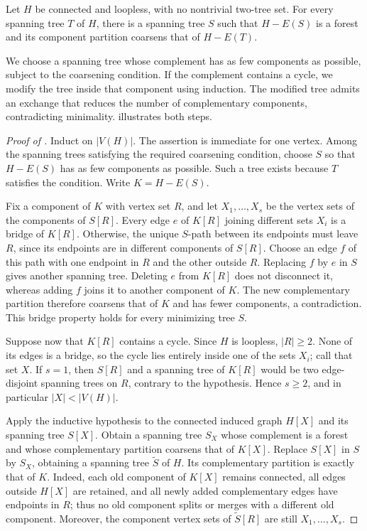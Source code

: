 \documentclass[USenglish, a4paper, thm-restate,numberwithinsect, cleveref]{lipics-v2021}
\begin{document}
\begin{lemma}\label{lem:characterization-exchange}
Let $H$ be connected and loopless, with no nontrivial two-tree set.
For every spanning tree $T$ of $H$, there is a spanning tree $S$ such
that $H-E(S)$ is a forest and its component partition coarsens that
of $H-E(T)$.
\end{lemma}

We choose a spanning tree whose complement has as few components as
possible, subject to the coarsening condition. If the complement
contains a cycle, we modify the tree inside that component using
induction. The modified tree admits an exchange that reduces the
number of complementary components, contradicting minimality.
 illustrates both steps.

\begin{proof}[Proof of ]
Induct on $|V(H)|$. The assertion is immediate for one vertex.
Among the spanning trees satisfying the required coarsening condition,
choose $S$ so that $H-E(S)$ has as few components as possible. Such a
tree exists because $T$ satisfies the condition. Write $K=H-E(S)$.

Fix a component of $K$ with vertex set $R$, and let $X_1,\ldots,X_s$
be the vertex sets of the components of $S[R]$.
Every edge $e$ of $K[R]$ joining different sets $X_i$ is a bridge
of $K[R]$. Otherwise, the unique $S$-path between its endpoints must
leave $R$, since its endpoints are in different components of $S[R]$.
Choose an edge $f$ of this path with one endpoint in $R$ and the other
outside $R$. Replacing $f$ by $e$ in $S$ gives another spanning tree.
Deleting $e$ from $K[R]$ does not disconnect it, whereas adding $f$
joins it to another component of $K$. The new complementary partition
therefore coarsens that of $K$ and has fewer components, a contradiction.
This bridge property holds for every minimizing tree $S$.

Suppose now that $K[R]$ contains a cycle. Since $H$ is loopless,
$|R|\geq2$. None of its edges is a
bridge, so the cycle lies entirely inside one of the sets $X_i$;
call that set $X$. If $s=1$, then $S[R]$ and a spanning
tree of $K[R]$ would be two edge-disjoint spanning trees on $R$, contrary
to the hypothesis. Hence $s\geq2$, and in particular
$|X|<|V(H)|$.

Apply the inductive hypothesis to the connected induced graph $H[X]$
and its spanning tree $S[X]$. Obtain a spanning tree $S_X$ whose
complement is a forest and whose complementary partition coarsens
that of $K[X]$. Replace $S[X]$ in $S$ by $S_X$, obtaining a spanning
tree $\widetilde S$ of $H$. Its complementary partition is exactly
that of $K$. Indeed, each old component of $K[X]$ remains connected,
all edges outside $H[X]$ are retained, and all newly added complementary
edges have endpoints in $R$; thus no old component splits or merges
with a different old component. Moreover, the component vertex sets
of $\widetilde S[R]$ are still $X_1,\ldots,X_s$.


\end{proof}
\end{document}
